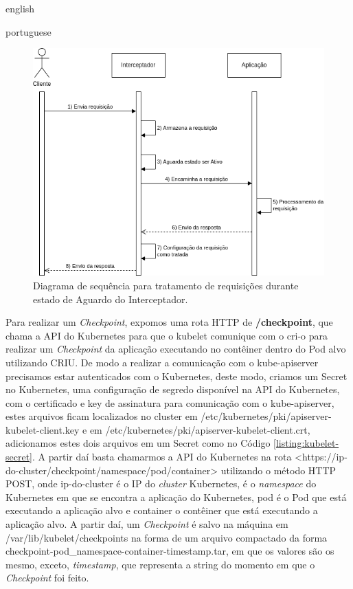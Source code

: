 \begin{otherlanguage*}{english}
\begin{otherlanguage*}{portuguese}
\begin{figure}[h]
\centering
\includegraphics[scale=0.46]{images/wait-state.png}
\caption{Diagrama de sequência para tratamento de requisições durante estado de Aguardo do Interceptador.}
\label{fig:diagram-wait-state-interceptor}
\end{figure}

Para realizar um \textit{Checkpoint}, expomos uma rota HTTP de \textbf{/checkpoint}, que
chama a API do Kubernetes para que o kubelet comunique com o cri-o para realizar um 
\textit{Checkpoint} da aplicação executando no contêiner dentro do Pod alvo utilizando
CRIU. De modo a realizar a comunicação com o kube-apiserver precisamos estar autenticados
com o Kubernetes, deste modo, criamos um Secret no Kubernetes, uma configuração de segredo
disponível na API do Kubernetes, com o certificado e key de assinatura para comunicação
com o kube-apiserver, estes arquivos ficam localizados no cluster em
/etc/kubernetes/pki/apiserver-kubelet-client.key e em
/etc/kubernetes/pki/apiserver-kubelet-client.crt, adicionamos estes dois arquivos em um
Secret como no Código \ref{listing:kubelet-secret}. A partir daí basta chamarmos a API
do Kubernetes na rota <https://ip-do-cluster/checkpoint/namespace/pod/container>
utilizando o método HTTP POST, onde ip-do-cluster é o IP do \textit{cluster} Kubernetes,
é o \textit{namespace} do Kubernetes em que se encontra a aplicação do Kubernetes, pod é
o Pod que está executando a aplicação alvo e container o contêiner que está executando a
aplicação alvo. A partir daí, um \textit{Checkpoint} é salvo na máquina em
/var/lib/kubelet/checkpoints na forma de um arquivo compactado da forma
checkpoint-pod\_namespace-container-timestamp.tar, em que os valores são os mesmo,
exceto, \textit{timestamp}, que representa a string do momento em que o \textit{Checkpoint}
foi feito.


\end{otherlanguage*}
\end{otherlanguage*}
